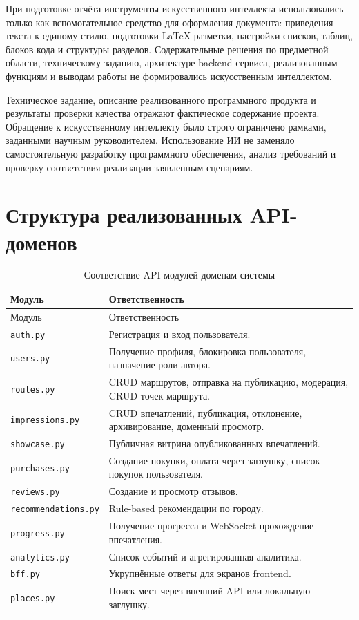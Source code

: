 \documentclass[a4paper,12pt]{extarticle}
\begin{document}
При подготовке отчёта инструменты искусственного интеллекта использовались только как вспомогательное средство для оформления документа: приведения текста к единому стилю, подготовки LaTeX-разметки, настройки списков, таблиц, блоков кода и структуры разделов. Содержательные решения по предметной области, техническому заданию, архитектуре backend-сервиса, реализованным функциям и выводам работы не формировались искусственным интеллектом.

Техническое задание, описание реализованного программного продукта и результаты проверки качества отражают фактическое содержание проекта. Обращение к искусственному интеллекту было строго ограничено рамками, заданными научным руководителем. Использование ИИ не заменяло самостоятельную разработку программного обеспечения, анализ требований и проверку соответствия реализации заявленным сценариям.

\newpage
\appendix

\section{Структура реализованных API-доменов}

\begin{longtable}{L{0.24\textwidth}L{0.66\textwidth}}
	\caption{Соответствие API-модулей доменам системы}
	\label{table:api-modules}\\
	\toprule
	Модуль & Ответственность \\
	\midrule
	\endfirsthead
	\toprule
	Модуль & Ответственность \\
	\midrule
	\endhead
	\texttt{auth.py} & Регистрация и вход пользователя. \\
	\texttt{users.py} & Получение профиля, блокировка пользователя, назначение роли автора. \\
	\texttt{routes.py} & CRUD маршрутов, отправка на публикацию, модерация, CRUD точек маршрута. \\
	\texttt{impressions.py} & CRUD впечатлений, публикация, отклонение, архивирование, доменный просмотр. \\
	\texttt{showcase.py} & Публичная витрина опубликованных впечатлений. \\
	\texttt{purchases.py} & Создание покупки, оплата через заглушку, список покупок пользователя. \\
	\texttt{reviews.py} & Создание и просмотр отзывов. \\
	\texttt{recommendations.py} & Rule-based рекомендации по городу. \\
	\texttt{progress.py} & Получение прогресса и WebSocket-прохождение впечатления. \\
	\texttt{analytics.py} & Список событий и агрегированная аналитика. \\
	\texttt{bff.py} & Укрупнённые ответы для экранов frontend. \\
	\texttt{places.py} & Поиск мест через внешний API или локальную заглушку. \\
	\bottomrule
\end{longtable}
\end{document}

